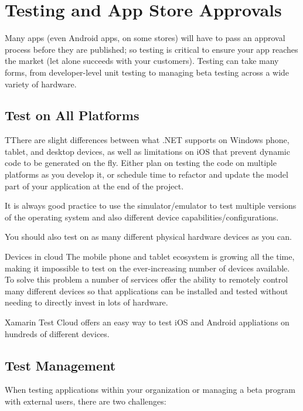 \section{Testing and App Store Approvals}

Many apps (even Android apps, on some stores) will have to pass an approval process before they are published; so testing is critical to ensure your app reaches the market (let alone succeeds with your customers). Testing can take many forms, from developer-level unit testing to managing beta testing across a wide variety of hardware.






\subsection{Test on All Platforms}

TThere are slight differences between what .NET supports on Windows phone, tablet, and desktop devices, as well as limitations on iOS that prevent dynamic code to be generated on the fly. Either plan on testing the code on multiple platforms as you develop it, or schedule time to refactor and update the model part of your application at the end of the project.

It is always good practice to use the simulator/emulator to test multiple versions of the operating system and also different device capabilities/configurations.

You should also test on as many different physical hardware devices as you can.


Devices in cloud
The mobile phone and tablet ecosystem is growing all the time, making it impossible to test on the ever-increasing number of devices available. To solve this problem a number of services offer the ability to remotely control many different devices so that applications can be installed and tested without needing to directly invest in lots of hardware.

Xamarin Test Cloud offers an easy way to test iOS and Android appliations on hundreds of different devices.


\subsection{Test Management}

When testing applications within your organization or managing a beta program with external users, there are two challenges:

